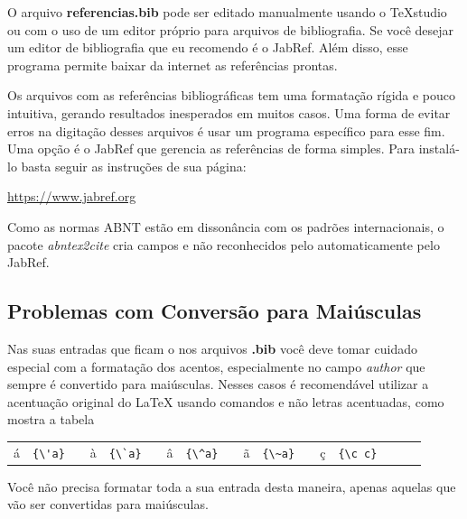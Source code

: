 \begin{apendicesenv}
    O arquivo \textbf{referencias.bib} pode ser editado manualmente usando o
    TeXstudio ou com o uso de um editor próprio para arquivos de bibliografia.
    Se você desejar um editor de bibliografia que eu recomendo é o JabRef.
    Além disso, esse programa permite baixar da internet as referências prontas.

    Os arquivos com as referências bibliográficas tem uma formatação rígida e pouco intuitiva, gerando resultados inesperados em muitos casos. Uma forma de evitar erros na digitação desses arquivos é usar um programa específico para esse fim. Uma opção é o JabRef que gerencia as referências de forma simples. Para instalá-lo basta seguir as instruções de sua página:
    \begin{center}
        \url{https://www.jabref.org}
    \end{center}

    Como as normas ABNT estão em dissonância com os padrões internacionais,
    o pacote \textit{abntex2cite} cria campos e não reconhecidos pelo automaticamente
    pelo JabRef.

    \subsection{Problemas com Conversão para Maiúsculas}

    Nas suas entradas que ficam o nos arquivos \textbf{.bib}
    você deve tomar cuidado especial com a formatação dos acentos,
    especialmente no campo \textit{author} que sempre é convertido para maiúsculas.
    Nesses casos é recomendável utilizar a acentuação original do \LaTeX{}
    usando comandos e não letras acentuadas, como mostra a tabela

    \begin{center}
        \begin{tabular}{clcclcclcclcclccl}
            á & \verb!{\'a}! &  &
            à & \verb!{\`a}! &  &
            â & \verb!{\^a}! &  &
            ã & \verb!{\~a}! &  &
            ç & \verb!{\c c}!
        \end{tabular}
    \end{center}

    Você não precisa formatar toda a sua entrada desta maneira,
    apenas aquelas que vão ser convertidas para maiúsculas.

\end{apendicesenv}
